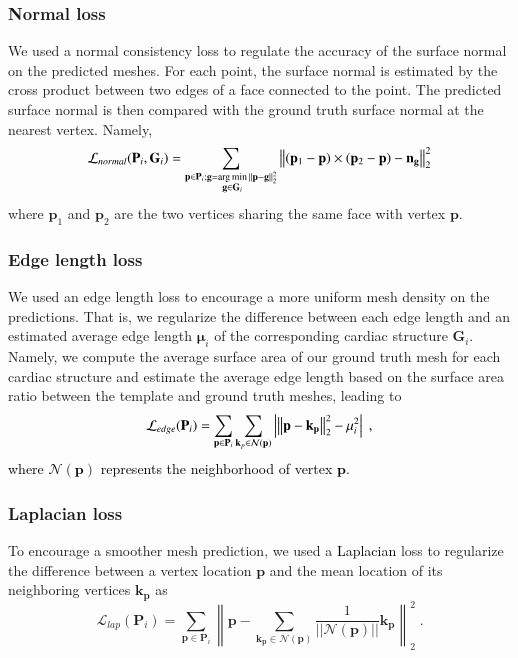 \documentclass[times,review,preprint,authoryear]{elsarticle}
\DeclareMathOperator*{\argmin}{arg\,min}
\begin{document}
\subsubsection{Normal loss} We used a normal consistency loss to regulate the accuracy of the surface normal on the predicted meshes. For each point, the surface normal is estimated by the cross product between two edges of a face connected to the point. The predicted surface normal is then compared with the ground truth surface normal at the nearest vertex. Namely, 
\begin{equation}
    \mathcal{L}_{normal} (\mathbf{P}_i, \mathbf{G}_i) = \textcolor{black}{ \sum_{\substack{\mathbf{p}\in \mathbf{P}_i}; \mathbf{g}=\argmin \limits_{\substack{\mathbf{g} \in \mathbf{G}_i}}||\mathbf{p}-\mathbf{g}||_2^2 } } \left\|(\mathbf{p}_1 - \mathbf{p}) \times (\mathbf{p}_2 - \mathbf{p}) - \mathbf{n_g} \right\|_2^2
\end{equation}
where $\mathbf{p}_1$ and $\mathbf{p}_2$ are the two vertices sharing the same face with vertex $\mathbf{p}$. 

\subsubsection{Edge length loss} 
We used an edge length loss to encourage a more uniform mesh density on the predictions. That is, we regularize the difference between each edge length and an estimated average edge length $\mathbf{\mu}_i$ of the corresponding cardiac structure $\mathbf{G}_i$. Namely, we compute the average surface area of our ground truth mesh for each cardiac structure and estimate the average edge length based on the surface area ratio between the template and ground truth meshes, leading to 
\begin{equation}
    \label{eq:edge_loss}
    \textcolor{black}{\mathcal{L}_{edge}(\mathbf{P}_i)} =\sum_{\mathbf{p} \in \mathbf{P}_i} \sum_{\mathbf{k}_p\in \mathcal{N}(\mathbf{p})} \left| \left\|\mathbf{p}-\textcolor{black}{\mathbf{k_p}}\right\|_2^2 - \mu_i^2 \right| \;,
\end{equation}
\textcolor{black}{where $\mathcal{N(\mathbf{p})}$ represents the neighborhood of vertex $\mathbf{p}$.} 
\subsubsection{Laplacian loss} To encourage a smoother mesh prediction, we used a \textcolor{black}{Laplacian} loss to regularize the difference between a vertex location $\mathbf{p}$ and the mean location of its neighboring vertices $\mathbf{k_p}$ as
\begin{equation}
    \mathcal{L}_{lap} (\mathbf{P}_i) = \sum_{\mathbf{p}\in \mathbf{P}_i} \left\|\mathbf{p}-\sum_{\mathbf{k_p}\in \mathcal{N}(\mathbf{p})} \frac{1}{||\mathcal{N}(\mathbf{p})||}\mathbf{k_p} \right\|_2^2 \;.
\end{equation}
\end{document}

